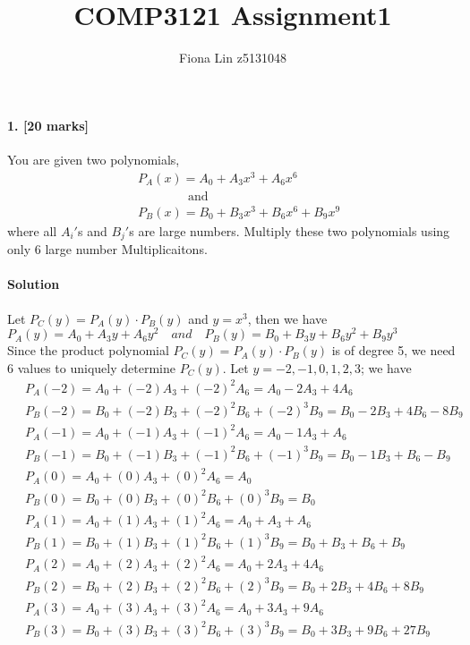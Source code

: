 \documentclass[a4paper]{scrartcl}
\title{COMP3121 Assignment1}
\author{Fiona Lin z5131048}
\begin{document}
\maketitle
\paragraph{1. [20 marks]}
\label{sec:Question 1}
You are given two polynomials,
\begin{align*} &\
  P_A(x) = A_0 + A_3x^3+A_6x^6\\ &\
\qquad\qquad\text{and}\\ &\
  P_B(x) = B_0 + B_3x^3+B_6x^6+B_9x^9
\end{align*}
where all $A_i'$s and $B_j'$s are large numbers. Multiply these two polynomials using only 6 large number Multiplicaitons.
\paragraph{Solution}
Let $P_C(y)=P_A(y) \cdot P_B(y)$ and $y =x^3$, then we have\\
$P_A(y) = A_0 + A_3 y + A_6 y^2 \quad and\quad
P_B(y) = B_0 + B_3 y + B_6 y^2 + B_9 y^3$\\
Since the product polynomial $P_C(y) = P_A(y)\cdot P_B(y)$ is of degree 5, we need 6 values to uniquely determine $P_C(y)$. Let $y = -2,-1,0,1,2,3$; we have
\begin{align*}
&\
P_A(-2) = A_0 + (-2) A_3 + (-2)^2  A_6  = A_0 - 2A_3 + 4A_6 \\ &\
P_B(-2) = B_0 + (-2) B_3 + (-2)^2  B_6 + (-2)^3  B_9 = B_0 -2B_3 + 4B_6 - 8B_9\\ &\
P_A(-1) = A_0 + (-1) A_3 + (-1)^2  A_6  = A_0 - 1A_3 +  A_6 \\ &\
P_B(-1) = B_0 + (-1) B_3 + (-1)^2  B_6 + (-1)^3  B_9 = B_0 -1B_3 +  B_6 -  B_9\\ &\
P_A(0) = A_0 + (0) A_3 + (0)^2 A_6 = A_0 \\ &\
P_B(0) = B_0 + (0) B_3 + (0)^2 B_6 + (0)^3 B_9= B_0\\ &\
P_A(1) = A_0 + (1) A_3 + (1)^2 A_6 = A_0 +  A_3 +   A_6 \\ &\
P_B(1) = B_0 + (1) B_3 + (1)^2 B_6 + (1)^3 B_9= B_0 +  B_3 +  B_6 +   B_9\\ &\
P_A(2) = A_0 + (2) A_3 + (2)^2 A_6 = A_0 + 2A_3 +  4A_6 \\ &\
P_B(2) = B_0 + (2) B_3 + (2)^2 B_6 + (2)^3 B_9= B_0 + 2B_3 + 4B_6 + 8 B_9\\ &\
P_A(3) = A_0 + (3) A_3 + (3)^2 A_6 = A_0 + 3A_3 +  9A_6 \\ &\
P_B(3) = B_0 + (3) B_3 + (3)^2 B_6 + (3)^3 B_9= B_0 + 3B_3 + 9B_6 + 27B_9\\ &\
\end{align*}
\end{document}
